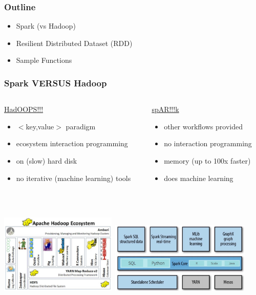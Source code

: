 \documentclass[xcolor={dvipsnames}]{beamer}
\begin{document}
\frame
{
\frametitle{Outline}

\LARGE

\begin{itemize}
\item Spark (vs Hadoop)
\item Resilient Distributed Dataset (RDD)
\item Sample Functions
\end{itemize}

}


\frame
{
\frametitle{Spark  VERSUS Hadoop}

\begin{columns}
\begin{column}{.65\textwidth}

\underline{HadOOPS!!!}
\begin{itemize}
\item $<$key,value$>$ paradigm 
\item ecosystem interaction programming  
\item on (slow) hard disk
\item no iterative (machine learning) tools
\end{itemize}

\end{column}
\begin{column}{.5\textwidth}

\underline{spAR!!!k}
\begin{itemize}
\item other workflows provided
\item no interaction programming
\item memory (up to 100x faster)
\item does machine learning
\end{itemize}

\end{column}
\end{columns}
${}$\\${}$\\

\hspace*{-2em}\includegraphics[height=1.5in]{stuff/hadoops.jpg}$\;\;$\includegraphics[height=1.35in]{stuff/spark1.jpg}$\quad\quad\quad$



}
\end{document}
